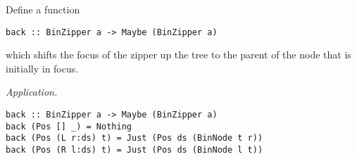 \begin{parts}
\begin{subparts}
        \subpart[3] Define a function 
        \vspace*{0.2cm}
        \begin{verbatim}
back :: BinZipper a -> Maybe (BinZipper a)
        \end{verbatim}
        \vspace*{0.2cm}
        which shifts the focus of the zipper up the tree to the parent of the node that is initially in focus. \droppoints 
        
        \begin{solution}
            \emph{Application.} 
            \begin{small}
                \begin{verbatim}
back :: BinZipper a -> Maybe (BinZipper a)
back (Pos [] _) = Nothing 
back (Pos (L r:ds) t) = Just (Pos ds (BinNode t r))
back (Pos (R l:ds) t) = Just (Pos ds (BinNode l t))
                \end{verbatim}
            \end{small}
        \end{solution}
        
    \end{subparts}
\end{parts}